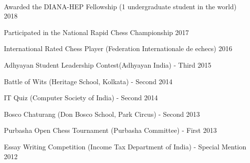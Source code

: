 \documentclass[10pt, letterpaper]{deps1}
\begin{document}
\\
\vspace{5pt}

\begin{tightitemize}
	\item Awarded the DIANA-HEP Fellowship (1 undergraduate student in the world) \hfill{2018}
	\item Participated in the National Rapid Chess Championship \hfill{2017}
	\item International Rated Chess Player (Federation Internationale de echecs) \hfill{2016}
	\item Adhyayan Student Leadership Contest(Adhyayan India) - Third \hfill{2015}
	\item Battle of Wits (Heritage School, Kolkata) - Second \hfill{2014}
	\item IT Quiz (Computer Society of India) - Second \hfill{2014}
	\item Bosco Chaturang (Don Bosco School, Park Circus) - Second \hfill{2013}
	\item Purbasha Open Chess Tournament (Purbasha Committee) - First \hfill{2013}
	\item Essay Writing Competition (Income Tax Department of India) - Special Mention \hfill{2012}
\end{tightitemize}
\end{document}
